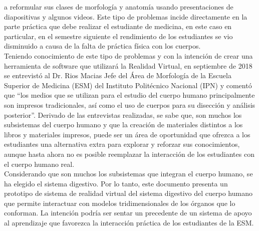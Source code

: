 a reformular sus clases de morfología y anatomía usando presentaciones de diapositivas y algunos videos. Este tipo de problemas incide directamente 
en la parte práctica que debe realizar el estudiante de medicina, en este caso en particular, en el semestre siguiente el rendimiento de los estudiantes 
se vio disminuido a causa de la falta de práctica física con los cuerpos.\\
Teniendo conocimiento de este tipo de problemas y con la intención de crear una herramienta de software que utilizará la Realidad Virtual, en septiembre 
de 2018 se entrevistó al Dr. Rios Macias Jefe del Área de Morfología de la Escuela Superior de Medicina (ESM) del Instituto Politécnico Nacional (IPN) y 
comentó que “los medios que se utilizan para el estudio del cuerpo humano principalmente son impresos tradicionales, así como el uso de cuerpos para su 
disección y análisis posterior”. Derivado de las entrevistas realizadas, se sabe que, son muchos los subsistemas del cuerpo humano y que la creación de 
materiales distintos a los libros y materiales impresos, puede ser un área de oportunidad que ofrezca a los estudiantes una alternativa extra para explorar 
y reforzar sus conocimientos, aunque hasta ahora no es posible reemplazar la interacción de los estudiantes con el cuerpo humano real.\\
Considerando que son muchos los subsistemas que integran el cuerpo humano, se ha elegido el sistema digestivo. Por lo tanto, este documento 
presenta un prototipo de sistema de realidad virtual del sistema digestivo del cuerpo humano que permite interactuar con modelos tridimensionales 
de los órganos que lo conforman. La intención podría ser sentar un precedente de un sistema de apoyo al aprendizaje que favorezca la 
interacción práctica\cite{moore1995learning} de los estudiantes de la ESM.\\

